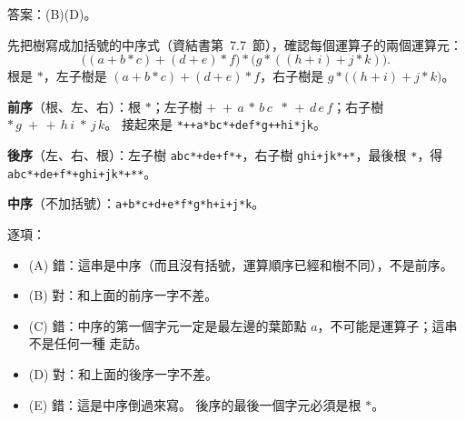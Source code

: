 \begin{pastsoln}
答案：(B)(D)。

先把樹寫成加括號的中序式（資結書第~7.7~節），確認每個運算子的兩個運算元：
\[
\bigl((a + b * c) + (d + e) * f\bigr) * \bigl(g * ((h + i) + j * k)\bigr).
\]
根是 $*$，左子樹是 $(a + b*c) + (d + e)*f$，右子樹是 $g * \bigl((h + i) + j*k\bigr)$。

\textbf{前序}（根、左、右）：根 $*$；左子樹 $+\;+\,a\,{*}\,b\,c\;\;{*}\,{+}\,d\,e\,f$；右子樹
${*}\,g\;{+}\,{+}\,h\,i\;{*}\,j\,k$。 接起來是 \texttt{*++a*bc*+def*g++hi*jk}。

\textbf{後序}（左、右、根）：左子樹 \texttt{abc*+de+f*+}，右子樹 \texttt{ghi+jk*+*}，最後根
\texttt{*}，得 \texttt{abc*+de+f*+ghi+jk*+**}。

\textbf{中序}（不加括號）：\texttt{a+b*c+d+e*f*g*h+i+j*k}。

逐項：
\begin{itemize}
\item (A) 錯：這串是中序（而且沒有括號，運算順序已經和樹不同），不是前序。
\item (B) 對：和上面的前序一字不差。
\item (C) 錯：中序的第一個字元一定是最左邊的葉節點 $a$，不可能是運算子；這串不是任何一種
走訪。
\item (D) 對：和上面的後序一字不差。
\item (E) 錯：這是中序倒過來寫。 後序的最後一個字元必須是根 $*$。
\end{itemize}
\end{pastsoln}
